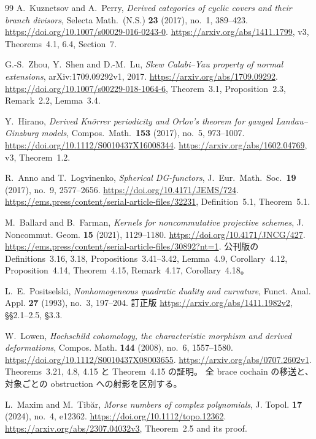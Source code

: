 \begin{thebibliography}{99}
A.~Kuznetsov and A.~Perry,
\emph{Derived categories of cyclic covers and their branch divisors},
Selecta Math.\ (N.S.) \textbf{23} (2017), no.~1, 389--423.
\url{https://doi.org/10.1007/s00029-016-0243-0}.
\url{https://arxiv.org/abs/1411.1799}, v3,
Theorems~4.1, 6.4, Section~7.

G.-S.~Zhou, Y.~Shen and D.-M.~Lu,
\emph{Skew Calabi--Yau property of normal extensions},
arXiv:1709.09292v1, 2017.
\url{https://arxiv.org/abs/1709.09292}.
\url{https://doi.org/10.1007/s00229-018-1064-6},
Theorem~3.1, Proposition~2.3, Remark~2.2, Lemma~3.4.

Y.~Hirano,
\emph{Derived Kn\"orrer periodicity and Orlov's theorem for gauged Landau--Ginzburg models},
Compos.\ Math.\ \textbf{153} (2017), no.~5, 973--1007.
\url{https://doi.org/10.1112/S0010437X16008344}.
\url{https://arxiv.org/abs/1602.04769}, v3, Theorem~1.2.

R.~Anno and T.~Logvinenko,
\emph{Spherical DG-functors},
J.\ Eur.\ Math.\ Soc.\ \textbf{19} (2017), no.~9, 2577--2656.
\url{https://doi.org/10.4171/JEMS/724}.
\url{https://ems.press/content/serial-article-files/32231},
Definition~5.1, Theorem~5.1.

M.~Ballard and B.~Farman,
\emph{Kernels for noncommutative projective schemes},
J. Noncommut. Geom. \textbf{15} (2021), 1129--1180.
\url{https://doi.org/10.4171/JNCG/427}.
\url{https://ems.press/content/serial-article-files/30892?nt=1}.
公刊版の Definitions~3.16, 3.18, Propositions~3.41--3.42,
Lemma~4.9, Corollary~4.12, Proposition~4.14,
Theorem~4.15, Remark~4.17, Corollary~4.18。

L.~E.~Positselski,
\emph{Nonhomogeneous quadratic duality and curvature},
Funct. Anal. Appl. \textbf{27} (1993), no.~3, 197--204.
訂正版 \url{https://arxiv.org/abs/1411.1982v2},
\S\S2.1--2.5, \S3.3.

W.~Lowen,
\emph{Hochschild cohomology, the characteristic morphism and derived deformations},
Compos. Math. \textbf{144} (2008), no.~6, 1557--1580.
\url{https://doi.org/10.1112/S0010437X08003655}.
\url{https://arxiv.org/abs/0707.2602v1}.
Theorems~3.21, 4.8, 4.15 と Theorem~4.15 の証明。
全 brace cochain の移送と、対象ごとの obstruction への射影を区別する。

L.~Maxim and M.~Tib\u ar,
\emph{Morse numbers of complex polynomials},
J. Topol. \textbf{17} (2024), no.~4, e12362.
\url{https://doi.org/10.1112/topo.12362}.
\url{https://arxiv.org/abs/2307.04032v3}, Theorem~2.5 and its proof.


\end{thebibliography}
